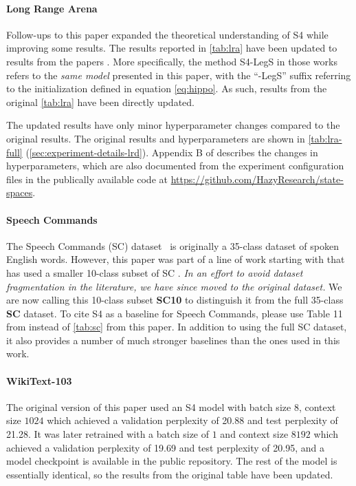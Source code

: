 \paragraph{Long Range Arena}

Follow-ups to this paper expanded the theoretical understanding of S4 while improving some results.
The results reported in \cref{tab:lra} have been updated to results from the papers \citep{gu2022s4d,gu2022hippo}.
More specifically, the method S4-LegS in those works refers to the \emph{same model} presented in this paper, with the ``-LegS'' suffix referring to the initialization defined in equation \eqref{eq:hippo}. As such, results from the original \cref{tab:lra} have been directly updated.

The updated results have only minor hyperparameter changes compared to the original results. The original results and hyperparameters are shown in \cref{tab:lra-full} (\cref{sec:experiment-details-lrd}).
Appendix B of \citep{gu2022s4d} describes the changes in hyperparameters, which are also documented from the experiment configuration files in the publically available code at \url{https://github.com/HazyResearch/state-spaces}.

\paragraph{Speech Commands}

The Speech Commands (SC) dataset~\citep{Warden2018SpeechCA} is originally a 35-class dataset of spoken English words.
However, this paper was part of a line of work starting with \citet{kidger2020neural} that has used a smaller 10-class subset of SC \citep{kidger2020neural,romero2021ckconv,gu2021lssl,romero2022flexconv}.
\emph{In an effort to avoid dataset fragmentation in the literature, we have since moved to the original dataset.}
We are now calling this 10-class subset \textbf{SC10} to distinguish it from the full 35-class \textbf{SC} dataset.
To cite S4 as a baseline for Speech Commands, please use Table 11 from \citep{gu2022s4d} instead of \cref{tab:sc} from this paper.
In addition to using the full SC dataset, it also provides a number of much stronger baselines than the ones used in this work.


\paragraph{WikiText-103}

The original version of this paper used an S4 model with batch size \( 8 \), context size \( 1024 \) which achieved a validation perplexity of 20.88 and test perplexity of 21.28.
It was later retrained with a batch size of \( 1 \) and context size \( 8192 \) which achieved a validation perplexity of 19.69 and test perplexity of 20.95, and a model checkpoint is available in the public repository.
The rest of the model is essentially identical, so the results from the original table have been updated.
